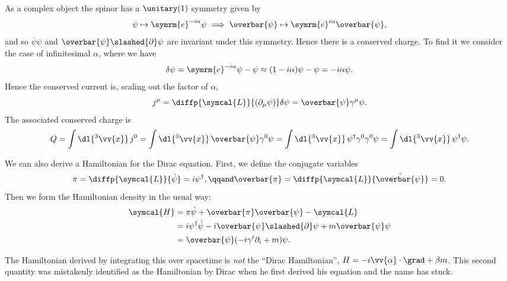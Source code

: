 \documentclass[fleqn]{NotesClass}
\newcommand{\e}{\symrm{e}}
\newcommand{\lagrangianDensity}{\symcal{L}}
\newcommand{\hamiltonianDensity}{\symcal{H}}
\newcommand{\hermit}{{\dagger}}
\newcommand{\diracadjoint}[1]{\overbar{#1}}
\begin{document}
    As a complex object the spinor has a \(\unitary(1)\) symmetry given by
    \begin{equation}
        \psi \mapsto \e^{-i\alpha}\psi \implies \diracadjoint{\psi} \mapsto \e^{i\alpha}\diracadjoint{\psi},
    \end{equation}
    and so \(\diracadjoint{\psi}\psi\) and \(\diracadjoint{\psi}\slashed{\partial}\psi\) are invariant under this symmetry.
    Hence there is a conserved charge.
    To find it we consider the case of infinitesimal \(\alpha\), where we have
    \begin{equation}
        \delta \psi = \e^{-i\alpha}\psi - \psi \approx (1 - i\alpha)\psi - \psi = -i\alpha\psi.
    \end{equation}
    Hence the conserved current is, scaling out the factor of \(\alpha\),
    \begin{equation}
        j^\mu = \diffp{\lagrangianDensity}{(\partial_\mu \psi)} \delta\psi = \diracadjoint{\psi}\gamma^\mu\psi.
    \end{equation}
    The associated conserved charge is
    \begin{equation}
        Q = \int \dl{^3\vv{x}} \, j^0 = \int\dl{^3\vv{x}} \, \diracadjoint{\psi} \gamma^0 \psi = \int \dl{^3\vv{x}} \, \psi^\hermit \gamma^0 \gamma^0 \psi = \int \dl{^3\vv{x}} \, \psi^\hermit \psi.
    \end{equation}
    
    We can also derive a Hamiltonian for the Dirac equation.
    First, we define the conjugate variables
    \begin{equation}
        \pi = \diffp{\lagrangianDensity}{\dot{\psi}} = i\psi^\hermit, \qqand \diracadjoint{\pi} = \diffp{\lagrangianDensity}{\dot{\diracadjoint{\psi}}} = 0.
    \end{equation}
    Then we form the Hamiltonian density in the usual way:
    \begin{align}
        \hamiltonianDensity &= \pi\dot{\psi} + \diracadjoint{\pi}\diracadjoint{\psi} - \lagrangianDensity\\
        &= i\psi^\hermit \dot{\psi} - i\diracadjoint{\psi}\slashed{\partial}\psi + m\diracadjoint{\psi}\psi\\
        &= \diracadjoint{\psi}(-i\gamma^i\partial_i + m)\psi.
    \end{align}
    \begin{wrn}
        The Hamiltonian derived by integrating this over spacetime is \emph{not} the \enquote{Dirac Hamiltonian}, \(H = -i\vv{\alpha} \cdot \grad + \beta m\).
        This second quantity was mistakenly identified as the Hamiltonian by Dirac when he first derived his equation and the name has stuck.
    \end{wrn}
    
\end{document}
